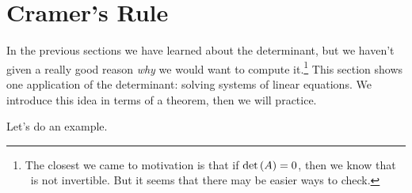 \section{Cramer's Rule}\label{sec:cramer}



In the previous sections we have learned about the determinant, but we haven't given a really good reason \textit{why} we would want to compute it.\footnote{The closest we came to motivation is that if $\text{det}\left(A\right) =0$, then we know that \tta\ is not invertible. But it seems that there may be easier ways to check.} This section shows one application of the determinant: solving systems of linear equations. We introduce this idea in terms of a theorem, then we will practice.


Let's do an example.\\

